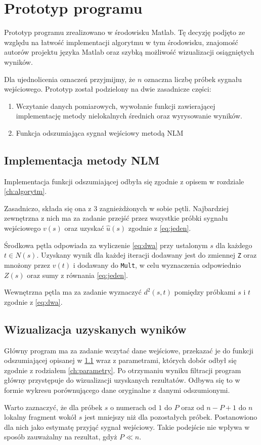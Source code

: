 \section{Prototyp programu}

Prototyp programu zrealizowano w środowisku Matlab. Tę decyzję podjęto ze względu na łatwość implementacji algorytmu w tym środowisku, znajomość autorów projektu języka Matlab oraz szybką możliwość wizualizacji osiągniętych wyników.

Dla ujednolicenia oznaczeń przyjmijmy, że $ n $ oznaczna liczbę próbek sygnału wejściowego. Prototyp został podzielony na dwie zasadnicze części:

\begin{enumerate}
	\item Wczytanie danych pomiarowych, wywołanie funkcji zawierającej implementację metody nielokalnych średnich oraz wyrysowanie wyników.
	\item Funkcja odszumiająca sygnał wejściowy metodą NLM
\end{enumerate}

\subsection{Implementacja metody NLM}
\label{ch:implementacja}
Implementacja funkcji odszumiającej odbyła się zgodnie z opisem w rozdziale \ref{ch:algorytm}. 

Zasadniczo, składa się ona z 3 zagnieżdżonych w sobie pętli. Najbardziej zewnętrzna z nich ma za zadanie przejść przez wszystkie próbki sygnału wejściowego $ v(s) $ oraz uzyskać $ \hat{u}(s) $ zgodnie z \eqref{eq:jeden}.

Środkowa pętla odpowiada za wyliczenie \eqref{eq:dwa} przy ustalonym $ s $ dla każdego $ t\in N(s) $. Uzyskany wynik dla każdej iteracji dodawany jest do zmiennej \texttt{Z} oraz mnożony przez $ v(t) $ i dodawany do \texttt{Mult}, w celu wyznaczenia odpowiednio $ Z(s) $ oraz sumy z równania \eqref{eq:jeden}.

Wewnętrzna pętla ma za zadanie wyznaczyć $ d^{2}(s,t) $ pomiędzy próbkami $ s $ i $ t $ zgodnie z \eqref{eq:dwa}. 

\subsection{Wizualizacja uzyskanych wyników}
Główny program ma za zadanie wczytać dane wejściowe, przekazać je do funkcji odszumiającej opisanej w \ref{ch:implementacja} wraz z parametrami, których dobór odbył się zgodnie z rodziałem  \ref{ch:parametry}. Po otrzymaniu wyniku filtracji program główny przystępuje do wizualizacji uzyskanych rezultatów. Odbywa się to w formie wykresu porównującego dane oryginalne z danymi odszumionymi.

Warto zaznaczyć, że dla próbek $ s $ o numerach od $ 1 $ do $ P $ oraz od $ n-P+1 $ do $ n $ lokalny fragment wokół $ s $ jest mniejszy niż dla pozostałych próbek. Postanowiono dla nich jako estymatę przyjąć sygnał wejściowy. Takie podejście nie wpływa w sposób zauważalny na rezultat, gdyż $ P\ll n $.